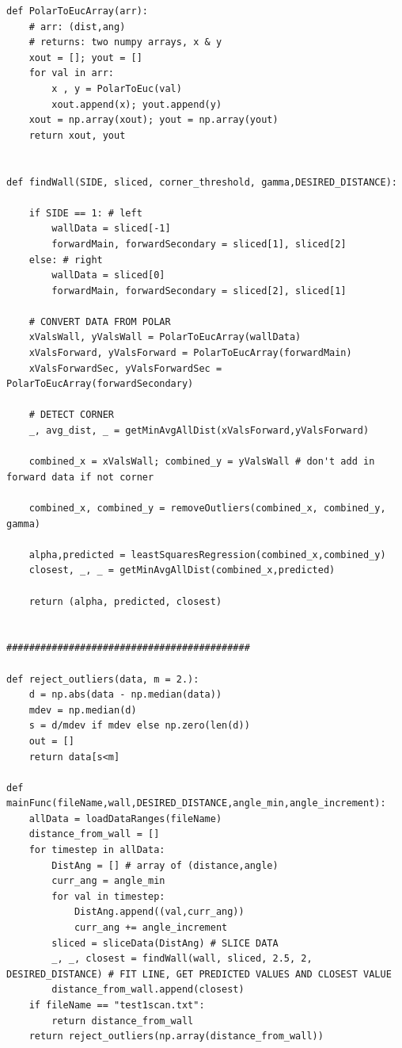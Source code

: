 \documentclass{article}
\begin{document}
{\begin{verbatim}
def PolarToEucArray(arr):
    # arr: (dist,ang)
    # returns: two numpy arrays, x & y
    xout = []; yout = []
    for val in arr:
        x , y = PolarToEuc(val)
        xout.append(x); yout.append(y)
    xout = np.array(xout); yout = np.array(yout)
    return xout, yout


def findWall(SIDE, sliced, corner_threshold, gamma,DESIRED_DISTANCE):

    if SIDE == 1: # left
        wallData = sliced[-1]
        forwardMain, forwardSecondary = sliced[1], sliced[2]
    else: # right
        wallData = sliced[0]
        forwardMain, forwardSecondary = sliced[2], sliced[1]
    
    # CONVERT DATA FROM POLAR
    xValsWall, yValsWall = PolarToEucArray(wallData)
    xValsForward, yValsForward = PolarToEucArray(forwardMain)
    xValsForwardSec, yValsForwardSec = PolarToEucArray(forwardSecondary)

    # DETECT CORNER
    _, avg_dist, _ = getMinAvgAllDist(xValsForward,yValsForward)

    combined_x = xValsWall; combined_y = yValsWall # don't add in forward data if not corner

    combined_x, combined_y = removeOutliers(combined_x, combined_y, gamma)

    alpha,predicted = leastSquaresRegression(combined_x,combined_y) 
    closest, _, _ = getMinAvgAllDist(combined_x,predicted)

    return (alpha, predicted, closest)


###########################################

def reject_outliers(data, m = 2.):
    d = np.abs(data - np.median(data))
    mdev = np.median(d)
    s = d/mdev if mdev else np.zero(len(d))
    out = []
    return data[s<m]

def mainFunc(fileName,wall,DESIRED_DISTANCE,angle_min,angle_increment):
    allData = loadDataRanges(fileName)
    distance_from_wall = []
    for timestep in allData:
        DistAng = [] # array of (distance,angle)
        curr_ang = angle_min
        for val in timestep:
            DistAng.append((val,curr_ang))
            curr_ang += angle_increment
        sliced = sliceData(DistAng) # SLICE DATA
        _, _, closest = findWall(wall, sliced, 2.5, 2, DESIRED_DISTANCE) # FIT LINE, GET PREDICTED VALUES AND CLOSEST VALUE
        distance_from_wall.append(closest)
    if fileName == "test1scan.txt":
        return distance_from_wall
    return reject_outliers(np.array(distance_from_wall))


\end{verbatim}}
\end{document}
